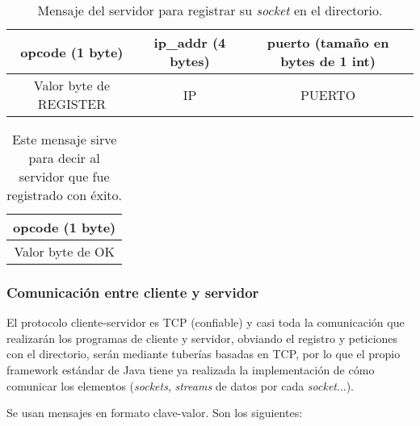\documentclass{article}
\begin{document}
\begin{table}[h!]\footnotesize
  \begin{tabular}{| c | c | c |}
  	\hline
      opcode (1 byte) & ip\_addr (4 bytes) & puerto (tamaño en bytes de 1 int) \\
      \hline
      Valor byte de REGISTER & IP & PUERTO \\
      \hline
  \end{tabular}
  \caption{Mensaje del servidor para registrar su \textit{socket} en el directorio.}
\end{table}

\begin{table}[h!]\footnotesize
  \begin{tabular}{| c |}
  	\hline
      opcode (1 byte) \\
      \hline
      Valor byte de OK \\
      \hline
  \end{tabular}
  \caption{Este mensaje sirve para decir al servidor que fue registrado con éxito.}
\end{table}



\subsubsection{Comunicación entre cliente y servidor}

El protocolo cliente-servidor es TCP (confiable) y casi toda la comunicación que realizarán los programas de cliente y servidor, obviando el registro y peticiones con el directorio, serán mediante tuberías basadas en TCP, por lo que el propio framework estándar de Java tiene ya realizada la implementación de cómo comunicar los elementos (\textit{sockets}, \textit{streams} de datos por cada \textit{socket}...).

Se usan mensajes en formato clave-valor. Son los siguientes:
\end{document}
